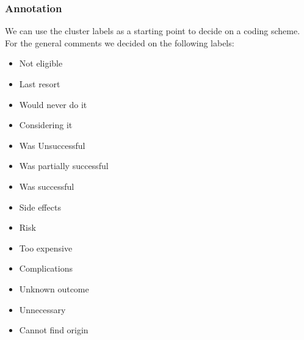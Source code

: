 \subsubsection{Annotation}
We can use the cluster labels as a starting point to decide on a coding scheme. For the general comments we decided on the following labels:
\begin{itemize}
    \item Not eligible
    \item Last resort
    \item Would never do it
    \item Considering it
    \item Was Unsuccessful
    \item Was partially successful
    \item Was successful
    \item Side effects
    \item Risk
    \item Too expensive
    \item Complications
    \item Unknown outcome
    \item Unnecessary
    \item Cannot find origin
\end{itemize}



